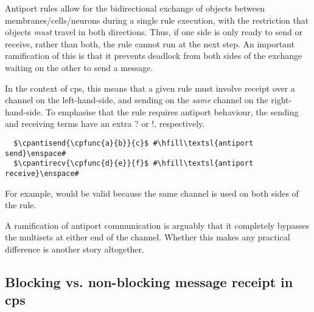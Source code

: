 Antiport rules \cite{Orellana-Martin2019,Paun2002} allow for the bidirectional exchange of objects between membranes/cells/neurons during a single rule execution, with the restriction that objects \emph{must} travel in both directions.  Thus, if one side is only ready to send or receive, rather than both, the rule cannot run at the next step.  An important ramification of this is that it prevents deadlock from both sides of the exchange waiting on the other to send a message.


In the context of \gls{cps}, this means that a given rule must involve receipt over a channel on the left-hand-side, and sending on the \emph{same} channel on the right-hand-side.  To emphasise that the rule requires antiport behaviour, the sending and receiving terms have an extra ? or !, respectively.

\lstset{xleftmargin=.5in, xrightmargin=.5in} 
\begin{lstlisting}
  $\cpantisend{\cpfunc{a}{b}}{c}$ #\hfill\textsl{antiport send}\enspace#
  $\cpantirecv{\cpfunc{d}{e}}{f}$ #\hfill\textsl{antiport receive}\enspace#
\end{lstlisting}

For example,  would be valid because the same channel is used on both sides of the rule.

\begin{anfxwarning}
A ramification of antiport communication is arguably that it completely bypasses the multisets at either end of the channel.  Whether this makes any practical difference is another story altogether.
\end{anfxwarning}

\subsection{\label{sec:nmp:blocking}Blocking vs. non-blocking message receipt in \texorpdfstring{\gls{cps}}{cP systems}}

